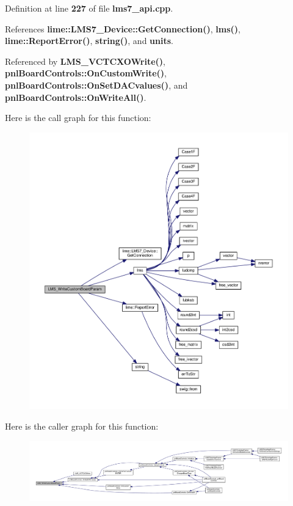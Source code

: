 Definition at line {\bf 227} of file {\bf lms7\+\_\+api.\+cpp}.



References {\bf lime\+::\+L\+M\+S7\+\_\+\+Device\+::\+Get\+Connection()}, {\bf lms()}, {\bf lime\+::\+Report\+Error()}, {\bf string()}, and {\bf units}.



Referenced by {\bf L\+M\+S\+\_\+\+V\+C\+T\+C\+X\+O\+Write()}, {\bf pnl\+Board\+Controls\+::\+On\+Custom\+Write()}, {\bf pnl\+Board\+Controls\+::\+On\+Set\+D\+A\+Cvalues()}, and {\bf pnl\+Board\+Controls\+::\+On\+Write\+All()}.



Here is the call graph for this function\+:
\nopagebreak
\begin{figure}[H]
\begin{center}
\leavevmode
\includegraphics[width=350pt]{df/de1/lms7__api_8cpp_a33751cada624efd567e37df81a57c639_cgraph}
\end{center}
\end{figure}




Here is the caller graph for this function\+:
\nopagebreak
\begin{figure}[H]
\begin{center}
\leavevmode
\includegraphics[width=350pt]{df/de1/lms7__api_8cpp_a33751cada624efd567e37df81a57c639_icgraph}
\end{center}
\end{figure}


